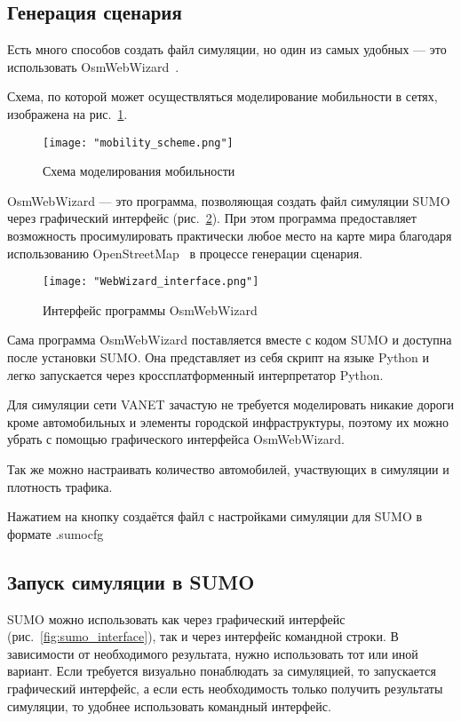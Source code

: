 \subsection{Генерация сценария}

Есть много способов создать файл симуляции, но один из самых удобных --- это использовать OsmWebWizard~\cite{osmwebwizard}. 

Схема, по которой может осуществляться моделирование мобильности в сетях, изображена на рис.~\ref{fig:mobility_scheme}.

\begin{figure}[!h]
 \centering
 \texttt{[image: "mobility\_scheme.png"]}
 \caption{Схема моделирования мобильности}
 \label{fig:mobility_scheme}
\end{figure}

OsmWebWizard --- это программа, позволяющая создать файл симуляции SUMO через графический интерфейс (рис.~\ref{fig:webwizard_interface_1}). При этом программа предоставляет возможность просимулировать практически любое место на карте мира благодаря использованию OpenStreet\-Map~\cite{osm} в процессе генерации сценария.

\begin{figure}[!h]
    \centering
    \texttt{[image: "WebWizard\_interface.png"]}
    \caption{Интерфейс программы OsmWebWizard}
    \label{fig:webwizard_interface_1}
\end{figure}

Сама программа OsmWebWizard поставляется вместе с кодом SUMO и доступна после установки SUMO. Она представляет из себя скрипт на языке Python и легко запускается через кроссплатформенный интерпретатор Python.

Для симуляции сети VANET зачастую не требуется моделировать никакие дороги кроме автомобильных и элементы городской инфраструктуры, поэтому их можно убрать с помощью графического интерфейса OsmWebWizard. 

Так же можно настраивать количество автомобилей, участвующих в симуляции и плотность трафика.

Нажатием на кнопку  создаётся файл с настройками симуляции для SUMO в формате .sumocfg

\subsection{Запуск симуляции в SUMO}

SUMO можно использовать как через графический интерфейс (рис.~\ref{fig:sumo_interface}), так и через интерфейс командной строки. В зависимости от необходимого результата, нужно использовать тот или иной вариант. Если требуется визуально понаблюдать за симуляцией, то запускается графический интерфейс, а если есть необходимость только получить результаты симуляции, то удобнее использовать командный интерфейс.

